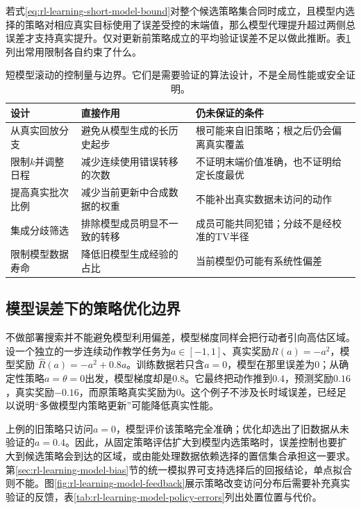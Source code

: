 若式\eqref{eq:rl-learning-short-model-bound}对整个候选策略集合同时成立，且模型内选择的策略对相应真实目标使用了误差受控的末端值，那么模型代理提升超过两侧总误差才支持真实提升。仅对更新前策略成立的平均验证误差不足以做此推断。表\ref{tab:rl-learning-rollout-controls}列出常用限制各自约束了什么。

\begin{table}[t]
  \centering
  \small
  \begin{tabularx}{\linewidth}{>{\raggedright\arraybackslash}p{25mm} >{\raggedright\arraybackslash}X >{\raggedright\arraybackslash}X}
    \toprule
    设计 & 直接作用 & 仍未保证的条件 \\
    \midrule
    从真实回放分支 & 避免从模型生成的长历史起步 & 根可能来自旧策略；根之后仍会偏离真实覆盖 \\
    限制$k$并调整日程 & 减少连续使用错误转移的次数 & 不证明末端价值准确，也不证明给定长度最优 \\
    提高真实批次比例 & 减少当前更新中合成数据的权重 & 不能补出真实数据未访问的动作 \\
    集成分歧筛选 & 排除模型成员明显不一致的转移 & 成员可能共同犯错；分歧不是经校准的TV半径 \\
    限制模型数据寿命 & 降低旧模型生成经验的占比 & 当前模型仍可能有系统性偏差 \\
    \bottomrule
  \end{tabularx}
  \caption{短模型滚动的控制量与边界。它们是需要验证的算法设计，不是全局性能或安全证明。}
  \label{tab:rl-learning-rollout-controls}
\end{table}

\subsection{模型误差下的策略优化边界}
\label{sec:rl-learning-model-policy-boundary}

不做部署搜索并不能避免模型利用偏差，模型梯度同样会把行动者引向高估区域。设一个独立的一步连续动作教学任务为$a\in[-1,1]$、真实奖励$R(a)=-a^2$，模型奖励
$\widehat R(a)=-a^2+0.8a$。训练数据若只含$a=0$，模型在那里误差为0；从确定性策略$a=\theta=0$出发，模型梯度却是$0.8$。它最终把动作推到$0.4$，预测奖励$0.16$，真实奖励$-0.16$，而原策略真实奖励为0。这个例子不涉及长时域误差，已经足以说明“多做模型内策略更新”可能降低真实性能。

上例的旧策略只访问$a=0$，模型评价该策略完全准确；优化却选出了旧数据从未验证的$a=0.4$。因此，从固定策略评估扩大到模型内选策略时，误差控制也要扩大到候选策略会到达的区域，或由能处理数据依赖选择的置信集合承担这一要求。第\ref{sec:rl-learning-model-bias}节的统一模拟界可支持选择后的回报结论，单点拟合则不能。图\ref{fig:rl-learning-model-feedback}展示策略改变访问分布后需要补充真实验证的反馈，表\ref{tab:rl-learning-model-policy-errors}列出处置位置与代价。

